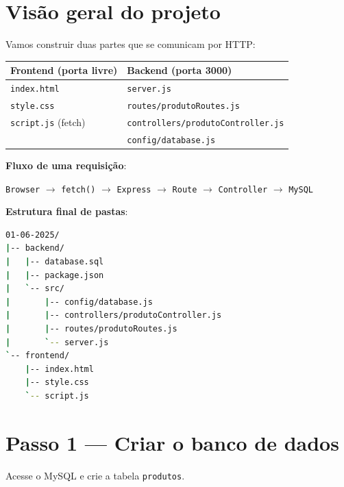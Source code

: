 \documentclass[11pt,a4paper]{article}
\begin{document}
\section{Visão geral do projeto}

Vamos construir duas partes que se comunicam por HTTP:

\begin{center}
\begin{tabular}{ll}
\toprule
\textbf{Frontend (porta livre)} & \textbf{Backend (porta 3000)} \\
\midrule
\texttt{index.html}            & \texttt{server.js} \\
\texttt{style.css}             & \texttt{routes/produtoRoutes.js} \\
\texttt{script.js} (fetch)     & \texttt{controllers/produtoController.js} \\
                               & \texttt{config/database.js} \\
\bottomrule
\end{tabular}
\end{center}

\textbf{Fluxo de uma requisição}:

\begin{center}
\texttt{Browser} $\rightarrow$ \texttt{fetch()} $\rightarrow$ \texttt{Express} $\rightarrow$ \texttt{Route} $\rightarrow$ \texttt{Controller} $\rightarrow$ \texttt{MySQL}
\end{center}

\textbf{Estrutura final de pastas}:

\begin{lstlisting}[language=bash]
01-06-2025/
|-- backend/
|   |-- database.sql
|   |-- package.json
|   `-- src/
|       |-- config/database.js
|       |-- controllers/produtoController.js
|       |-- routes/produtoRoutes.js
|       `-- server.js
`-- frontend/
    |-- index.html
    |-- style.css
    `-- script.js
\end{lstlisting}

\section{Passo 1 --- Criar o banco de dados}

Acesse o MySQL e crie a tabela \texttt{produtos}.
\end{document}
